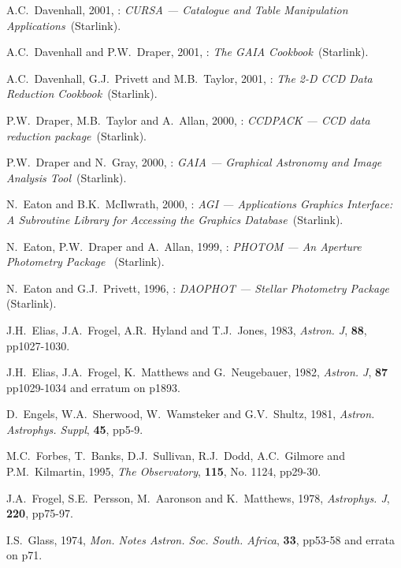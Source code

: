 \documentclass[twoside,11pt,nolof]{starlink}
\begin{document}
\begin{thebibliography}{99}
   A.C.~Davenhall, 2001, :
   \textit{CURSA --- Catalogue and Table Manipulation Applications}\,
   (Starlink).

   A.C.~Davenhall and P.W.~Draper, 2001,
   : \textit{The GAIA Cookbook}\, (Starlink).

   A.C.~Davenhall, G.J.~Privett and M.B.~Taylor, 2001,
   : \textit{The 2-D CCD Data Reduction Cookbook}\,
   (Starlink).

   P.W.~Draper, M.B.~Taylor and A.~Allan, 2000,
   : \textit{CCDPACK --- CCD data reduction package}\,
   (Starlink).

   P.W.~Draper and N.~Gray, 2000,
   : \textit{GAIA --- Graphical Astronomy and Image
   Analysis Tool}\, (Starlink).

   N.~Eaton and B.K.~McIlwrath, 2000,
   : \textit{AGI --- Applications Graphics Interface:
   A Subroutine Library for Accessing the Graphics Database}\, (Starlink).

   N.~Eaton, P.W.~Draper and A.~Allan, 1999,
   : \textit{PHOTOM --- An Aperture Photometry
   Package }\, (Starlink).

   N.~Eaton and G.J.~Privett, 1996, :
   \textit{DAOPHOT --- Stellar Photometry Package}\, (Starlink).

   J.H.~Elias, J.A.~Frogel, A.R.~Hyland and T.J.~Jones,
   1983, \textit{Astron. J}, \textbf{88}, pp1027-1030.

   J.H.~Elias, J.A.~Frogel, K.~Matthews and G.~Neugebauer,
   1982, \textit{Astron. J}, \textbf{87} pp1029-1034 and erratum on p1893.

   D.~Engels, W.A.~Sherwood, W.~Wamsteker and
   G.V.~Shultz, 1981, \textit{Astron. Astrophys. Suppl}, \textbf{45}, pp5-9.

   M.C.~Forbes, T.~Banks, D.J.~Sullivan, R.J.~Dodd,
   A.C.~Gilmore and P.M.~Kilmartin, 1995, \textit{The Observatory},
   \textbf{115}, No. 1124, pp29-30.

   J.A.~Frogel, S.E.~Persson, M.~Aaronson and
   K.~Matthews, 1978, \textit{Astrophys. J}, \textbf{220}, pp75-97.

   I.S.~Glass, 1974, \textit{Mon. Notes Astron. Soc.
   South. Africa}, \textbf{33}, pp53-58 and errata on p71.


\end{thebibliography}
\end{document}
